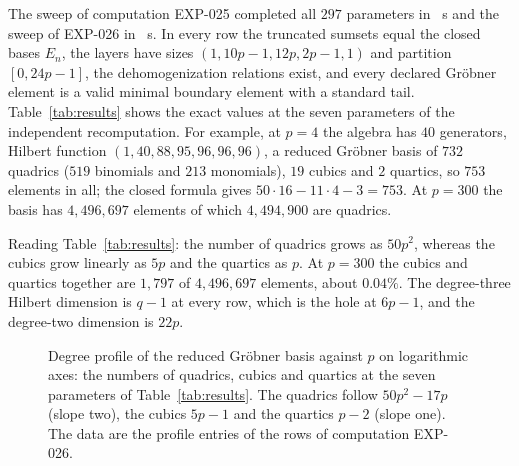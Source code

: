 \documentclass[11pt]{article}
\theoremstyle{definition}
\theoremstyle{remark}
\newcommand{\Cfiber}{\mathcal{C}}
\begin{document}
The sweep of computation EXP-025 completed all $297$ parameters in \ExpTwentyFiveSweepSeconds{}~s and
the sweep of EXP-026 in \ExpTwentySixSweepSeconds{}~s. In every row the truncated sumsets equal
the closed bases $E_n$, the layers have sizes $(1,10p-1,12p,2p-1,1)$ and partition $[0,24p-1]$,
the dehomogenization relations exist, and every declared Gr\"obner element is a valid minimal
boundary element with a standard tail. Table~\ref{tab:results} shows the exact values at the
seven parameters of the independent recomputation. For example, at $p=4$ the algebra has $40$
generators, Hilbert function $(1,40,88,95,96,96,96)$, a reduced Gr\"obner basis of $732$ quadrics
($519$ binomials and $213$ monomials), $19$ cubics and $2$ quartics, so $753$ elements in all;
the closed formula gives $50\cdot16-11\cdot4-3=753$. At $p=300$ the basis has $4{,}496{,}697$ elements
of which $4{,}494{,}900$ are quadrics.

\begin{table}[ht]
\centering
\small
\resizebox{\textwidth}{!}{}
\caption{Exact values of the sweep of computation EXP-026 at the seven parameters of the
independent recomputation: the number $q=24p$ of offsets, the number $|G_p|$ of generators, the
dimensions of $(\Cfiber_p)_2$ and $(\Cfiber_p)_3$ (the Hilbert function is $q$ from degree four on),
the number of reduced quadrics with their split into binomials and monomial zero-relations, and
the numbers of cubics and quartics. Every entry equals the closed formula of
Theorem~\ref{thm:groebner} and Proposition~\ref{prop:input}.}
\label{tab:results}
\end{table}

Reading Table~\ref{tab:results}: the number of quadrics grows as $50p^2$, whereas the cubics grow
linearly as $5p$ and the quartics as $p$. At $p=300$ the cubics and quartics together are
$1{,}797$ of $4{,}496{,}697$ elements, about $0.04\%$. The degree-three Hilbert dimension is
$q-1$ at every row, which is the hole at $6p-1$, and the degree-two dimension is $22p$.

\begin{figure}[ht]
\centering

\caption{Degree profile of the reduced Gr\"obner basis against $p$ on logarithmic axes: the
numbers of quadrics, cubics and quartics at the seven parameters of Table~\ref{tab:results}.
The quadrics follow $50p^2-17p$ (slope two), the cubics $5p-1$ and the quartics $p-2$
(slope one). The data are the profile entries of the rows of computation EXP-026.}
\label{fig:profile}
\end{figure}
\end{document}
